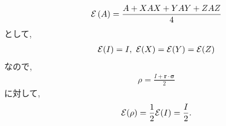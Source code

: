 \begin{ex}
    \label{ex8.17}
    \begin{align*}
        \mathcal{E} \left( A \right)
        =
        \frac{A + XAX + YAY + ZAZ}{4}
    \end{align*}
    として,
    \begin{align*}
        \mathcal{E}(I) = I,\ \mathcal{E}(X) = \mathcal{E}(Y) = \mathcal{E}(Z)
    \end{align*}
    なので,
    \begin{align*}
        \rho = \frac{I + \bm{r} \cdot \bm{\sigma}}{2}
    \end{align*}
    に対して,
    \begin{align*}
        \mathcal{E} ( \rho) = \frac{1}{2}\mathcal{E} ( I ) = \frac{I}{2}.
    \end{align*}
\end{ex}

